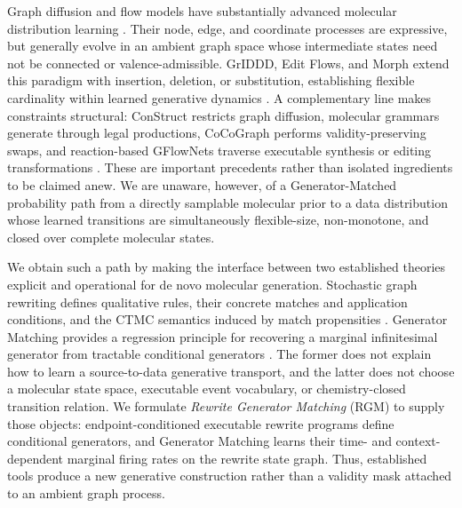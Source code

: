 \documentclass{article}
\newcommand{\rgm}{\textsc{RGM}\xspace}
\theoremstyle{definition}
\theoremstyle{remark}
\begin{document}
Graph diffusion and flow models have substantially advanced molecular distribution learning \citep{jo2022gdss,vignac2023digress,jo2023grum,xu2024disco,siraudin2024cometh,qin2025defog}. Their node, edge, and coordinate processes are expressive, but generally evolve in an ambient graph space whose intermediate states need not be connected or valence-admissible. GrIDDD, Edit Flows, and Morph extend this paradigm with insertion, deletion, or substitution, establishing flexible cardinality within learned generative dynamics \citep{ninniri2025griddd,havasi2025editflows,franke2026morph}. A complementary line makes constraints structural: ConStruct restricts graph diffusion, molecular grammars generate through legal productions, CoCoGraph performs validity-preserving swaps, and reaction-based GFlowNets traverse executable synthesis or editing transformations \citep{madeira2024construct,kajino2019mhg,guo2022grammar,ruizbotella2026cocograph,koziarski2024rgfn,zhu2026spacegfn}. These are important precedents rather than isolated ingredients to be claimed anew. We are unaware, however, of a Generator-Matched probability path from a directly samplable molecular prior to a data distribution whose learned transitions are simultaneously flexible-size, non-monotone, and closed over complete molecular states.

We obtain such a path by making the interface between two established theories explicit and operational for de novo molecular generation. Stochastic graph rewriting defines qualitative rules, their concrete matches and application conditions, and the CTMC semantics induced by match propensities \citep{danos2015thermodynamic,behr2021rewriting}. Generator Matching provides a regression principle for recovering a marginal infinitesimal generator from tractable conditional generators \citep{holderrieth2025generator}. The former does not explain how to learn a source-to-data generative transport, and the latter does not choose a molecular state space, executable event vocabulary, or chemistry-closed transition relation. We formulate \emph{Rewrite Generator Matching} (\rgm) to supply those objects: endpoint-conditioned executable rewrite programs define conditional generators, and Generator Matching learns their time- and context-dependent marginal firing rates on the rewrite state graph. Thus, established tools produce a new generative construction rather than a validity mask attached to an ambient graph process.
\end{document}
